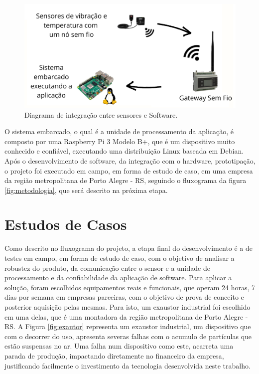 \begin{figure}[H]
    \caption{Diagrama de integração  entre sensores e Software.}
    \begin{center}
        \includegraphics[scale=0.8, page=1]{metodologia/img/fluxo_layout.pdf}
    \end{center}
    \label{fig:fluxo_integracao}
\end{figure}


O sistema embarcado, o qual é a unidade de processamento da aplicação, é composto por uma Raspberry Pi 3 Modelo B+, que é um dispositivo muito 
conhecido e confiável, executando uma distribuição Linux baseada em Debian. Após o desenvolvimento de software, da integração com o hardware, 
prototipação, o projeto foi executado em campo, em forma de estudo de caso, em uma empresa da região metropolitana de Porto Alegre - RS, seguindo o fluxograma da 
figura \ref{fig:metodologia}, que será descrito na próxima etapa.

% 

\section{Estudos de Casos}


Como descrito no fluxograma do projeto, a etapa final do desenvolvimento é a de testes em campo, em forma de estudo de caso, com o objetivo 
de analisar a robustez do produto, da comunicação entre o sensor e a unidade de processamento e da confiabilidade da aplicação de software. 
Para aplicar a solução, foram escolhidos equipamentos reais e funcionais, que operam 24 horas, 7 dias por semana em empresas parceiras,
com o objetivo de prova de conceito e posterior aquisição pelas mesmas. Para isto, um exaustor industrial foi escolhido em uma delas, que é 
uma montadora da região metropolitana de Porto Alegre - RS. A Figura \ref{fig:exautor} representa um exaustor industrial, um dispositivo que com o decorrer do uso, apresenta severas falhas com o acumulo 
de partículas que estão suspensas no ar. Uma falha num dispositivo como este, acarreta uma parada de  produção, impactando diretamente no 
financeiro da empresa, justificando facilmente o investimento da tecnologia desenvolvida neste trabalho.

